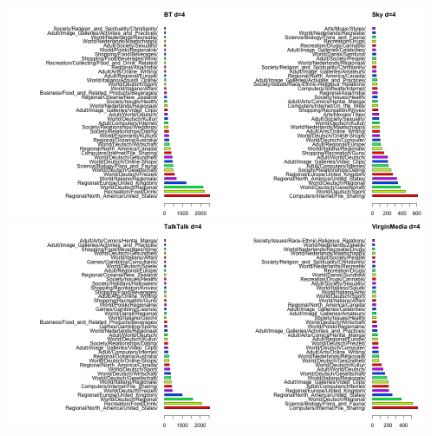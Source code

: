 \documentclass{bmcart}
\begin{document}
\begin{figure}[h!]
\caption{}
\includegraphics[width=0.49\textwidth]{imgs/BT-d-4-blocked-categories-to-date.png}\includegraphics[width=0.49\textwidth]{imgs/Sky-d-4-blocked-categories-to-date.png}
\includegraphics[width=0.49\textwidth]{imgs/TalkTalk-d-4-blocked-categories-to-date.png}\includegraphics[width=0.49\textwidth]{imgs//VirginMedia-d-4-blocked-categories-to-date.png}
\label{fig:broadband-blocked-categories}
\end{figure}
\end{document}
